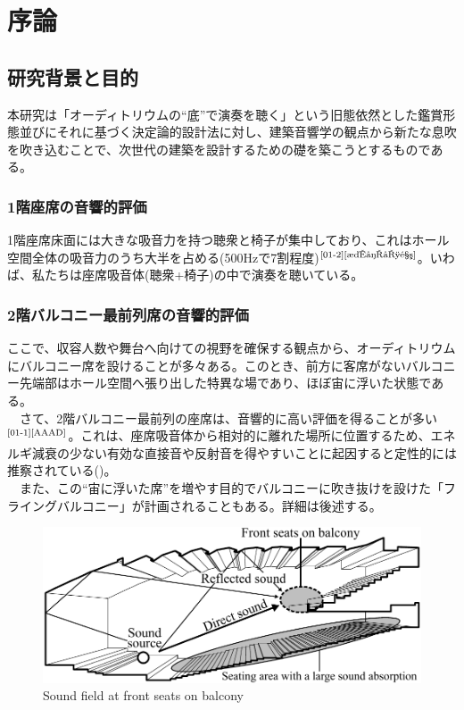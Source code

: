 \chapter{序論}
\thispagestyle{fancy}
\nobreak
\section{研究背景と目的}
本研究は「オーディトリウムの“底”で演奏を聴く」という旧態依然とした鑑賞形態並びにそれに基づく決定論的設計法に対し、建築音響学の観点から新たな息吹を吹き込むことで、次世代の建築を設計するための礎を築こうとするものである。

\subsection{1階座席の音響的評価}
1階座席床面には大きな吸音力を持つ聴衆と椅子が集中しており、これはホール空間全体の吸音力のうち大半を占める(500Hzで7割程度)$^{\text{\cite{01-2}{\cite{椅子吸音}}}}$。いわば、私たちは座席吸音体(聴衆+椅子)の中で演奏を聴いている。

\subsection{2階バルコニー最前列席の音響的評価}
ここで、収容人数や舞台へ向けての視野を確保する観点から、オーディトリウムにバルコニー席を設けることが多々ある。このとき、前方に客席がないバルコニー先端部はホール空間へ張り出した特異な場であり、ほぼ宙に浮いた状態である。
\\　さて、2階バルコニー最前列の座席は、音響的に高い評価を得ることが多い$^{\text{\cite{01-1}{\cite{AAAD}}}}$。これは、座席吸音体から相対的に離れた場所に位置するため、エネルギ減衰の少ない有効な直接音や反射音を得やすいことに起因すると定性的には推察されている()。
\\　また、この“宙に浮いた席”を増やす目的でバルコニーに吹き抜けを設けた「フライングバルコニー」が計画されることもある。詳細は後述する。
\\
\begin{figure}[h]
    \centering
    \includegraphics[keepaspectratio,scale=0.8]{01_att/second_balcony.pdf}
    \caption{\hspace{1mm}Sound field at front seats on balcony}
    \label{fig:2階バルコニー最前列席の音場}
\end{figure}

